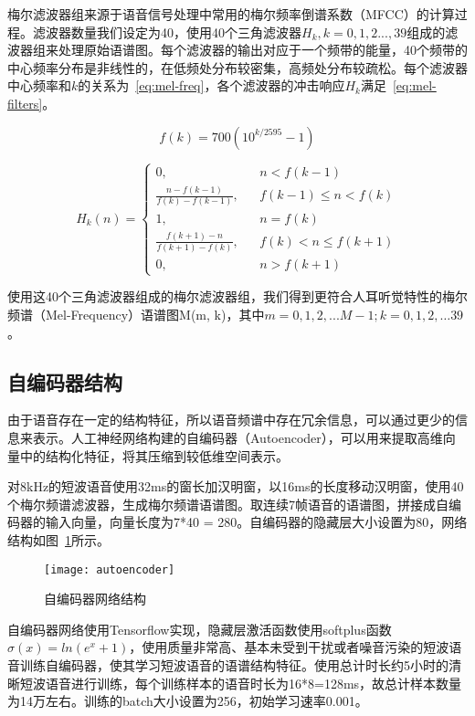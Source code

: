 梅尔滤波器组来源于语音信号处理中常用的梅尔频率倒谱系数（MFCC）的计算过程。滤波器数量我们设定为40，使用40个三角滤波器$H_k, k=0,1,2...,39$组成的滤波器组来处理原始语谱图。每个滤波器的输出对应于一个频带的能量，40个频带的中心频率分布是非线性的，在低频处分布较密集，高频处分布较疏松。每个滤波器中心频率和$k$的关系为~\ref{eq:mel-freq}，各个滤波器的冲击响应$H_k$满足~\ref{eq:mel-filters}。

\begin{equation}\label{eq:mel-freq}
f(k) = 700(10^{k/2595}-1)
\end{equation}

\begin{equation}\label{eq:mel-filters}
H_k(n) = \left\{
    \begin{array}{rcl}
    0, && {n<f(k-1)} \\
    \frac{n-f(k-1)}{f(k)-f(k-1)}, && {f(k-1)\leq n < f(k)} \\
    1, && {n=f(k)} \\
    \frac{f(k+1)-n}{f(k+1)-f(k)}, && {f(k) < n \leq f(k+1)} \\
    0, && {n > f(k+1)}
    \end{array} \right.
\end{equation}

使用这40个三角滤波器组成的梅尔滤波器组，我们得到更符合人耳听觉特性的梅尔频谱（Mel-Frequency）语谱图M(m, k)，其中$m=0,1,2,...M-1; k=0,1,2,…39$。

\subsection{自编码器结构}

由于语音存在一定的结构特征，所以语音频谱中存在冗余信息，可以通过更少的信息来表示。人工神经网络构建的自编码器（Autoencoder），可以用来提取高维向量中的结构化特征，将其压缩到较低维空间表示。

对8kHz的短波语音使用32ms的窗长加汉明窗，以16ms的长度移动汉明窗，使用40个梅尔频谱滤波器，生成梅尔频谱语谱图。取连续7帧语音的语谱图，拼接成自编码器的输入向量，向量长度为7*40 = 280。自编码器的隐藏层大小设置为80，网络结构如图~\ref{fig:autoencoder}所示。

\begin{figure}
\centering
\texttt{[image: autoencoder]}
\caption{自编码器网络结构\label{fig:autoencoder}}
\end{figure}

自编码器网络使用Tensorflow\cite{abadi2016tensorflow}实现，隐藏层激活函数使用softplus函数$\sigma(x)=ln⁡(e^x+1)$，使用质量非常高、基本未受到干扰或者噪音污染的短波语音训练自编码器，使其学习短波语音的语谱结构特征。使用总计时长约5小时的清晰短波语音进行训练，每个训练样本的语音时长为16*8=128ms，故总计样本数量为14万左右。训练的batch大小设置为256，初始学习速率0.001。


